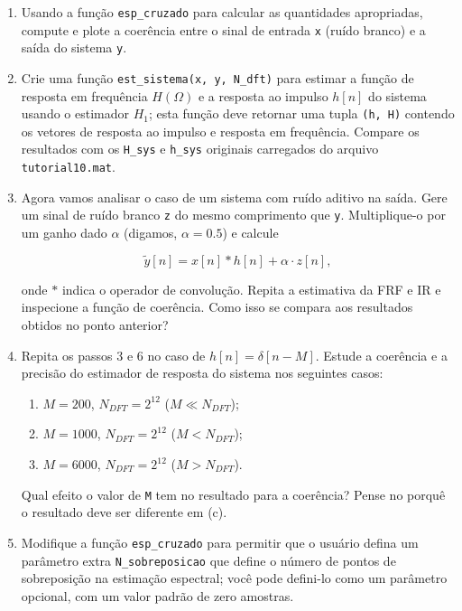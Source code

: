 \documentclass[a4paper,twoside,12pt]{article}
\begin{document}
\begin{enumerate}
		\item Usando a função {\tt esp\_cruzado} para calcular as quantidades apropriadas, compute e plote a coerência entre o sinal de entrada {\tt x} (ruído branco) e a saída do sistema {\tt y}.
		
		\item Crie uma função {\tt est\_sistema(x, y, N\_dft)} para estimar a função de resposta em frequência $H(\Omega)$ e a resposta ao impulso $h[n]$ do sistema usando o estimador $H_1$; esta função deve retornar uma tupla {\tt (h, H)} contendo os vetores de resposta ao impulso e resposta em frequência. Compare os resultados com os {\tt H\_sys} e {\tt h\_sys} originais carregados do arquivo {\tt tutorial10.mat}.
		
		\item Agora vamos analisar o caso de um sistema com ruído aditivo na saída. Gere um sinal de ruído branco {\tt z} do mesmo comprimento que {\tt y}. Multiplique-o por um ganho dado $\alpha$ (digamos, $\alpha = 0.5$) e calcule
		
		\begin{equation}
			\tilde{y}[n] = x[n] \ast h[n] + \alpha \cdot z[n],
		\end{equation}
		
		onde $\ast$ indica o operador de convolução. Repita a estimativa da FRF e IR e inspecione a função de coerência. Como isso se compara aos resultados obtidos no ponto anterior? 
		
		\item Repita os passos 3 e 6 no caso de $h[n] = \delta[n-M]$. Estude a coerência e a precisão do estimador de resposta do sistema nos seguintes casos:
		\begin{enumerate}
			\item $M = 200$, $N_{DFT} = 2^{12}$ ($M \ll N_{DFT}$);
			\item $M = 1000$, $N_{DFT} = 2^{12}$ ($M < N_{DFT}$);
			\item $M = 6000$, $N_{DFT} = 2^{12}$ ($M > N_{DFT}$).
		\end{enumerate}
		Qual efeito o valor de {\tt M} tem no resultado para a coerência? Pense no porquê o resultado deve ser diferente em (c).
		
		\item Modifique a função {\tt esp\_cruzado} para permitir que o usuário defina um parâmetro extra {\tt N\_sobreposicao} que define o número de pontos de sobreposição na estimação espectral; você pode defini-lo como um parâmetro opcional, com um valor padrão de zero amostras.
	\end{enumerate}
	
\end{document}
